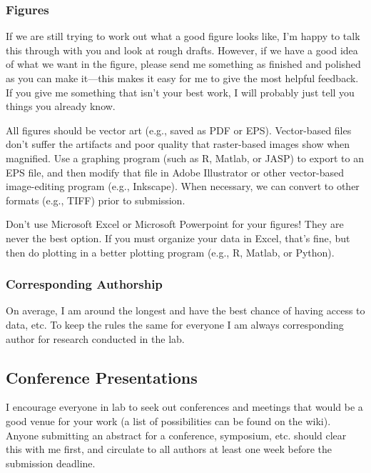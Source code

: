 \documentclass[letterpaper,11pt,oneside]{memoir}
\begin{document}
\subsubsection{Figures}
If we are still trying to work out what a good figure looks like, I'm happy to talk this through with you and look at rough drafts. However, if we have a good idea of what we want in the figure, please send me something as finished and polished as you can make it---this makes it easy for me to give the most helpful feedback. If you give me something that isn't your best work, I will probably just tell you things you already know.

All figures should be vector art (e.g., saved as PDF or EPS). Vector-based files don't suffer the artifacts and poor quality that raster-based images show when magnified. Use a graphing program (such as R, Matlab, or JASP) to export to an EPS file, and then modify that file in Adobe Illustrator or other vector-based image-editing program (e.g., Inkscape). When necessary, we can convert to other formats (e.g., TIFF) prior to submission. 

\begin{shaded}
\noindent Don't use Microsoft Excel or Microsoft Powerpoint for your figures! They are never the best option. If you must organize your data in Excel, that's fine, but then do plotting in a better plotting program (e.g., R, Matlab, or Python).
\end{shaded}


\subsubsection{Corresponding Authorship}
On average, I am around the longest and have the best chance of having access to data, etc. To keep the rules the same for everyone I am always corresponding author for research conducted in the lab.



\subsection{Conference Presentations}
I encourage everyone in lab to seek out conferences and meetings that would be a good venue for your work (a list of possibilities can be found on the wiki). Anyone submitting an abstract for a conference, symposium, etc. should clear this with me first, and circulate to all authors at least one week before the submission deadline.
\end{document}
